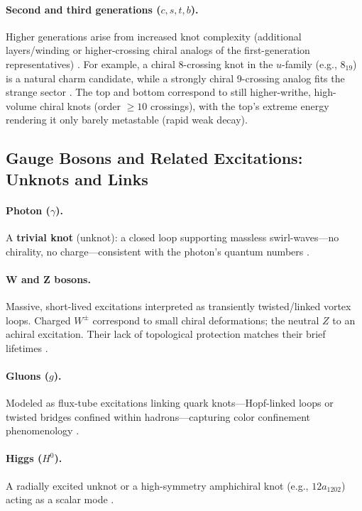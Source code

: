 \documentclass[11pt]{article}
\begin{document}
    \paragraph{Second and third generations ($c,s,t,b$).}
        Higher generations arise from increased knot complexity (additional layers/winding or higher-crossing chiral analogs of the first-generation representatives) \cite{Iskandarani2025Mass}. For example, a chiral 8-crossing knot in the $u$-family (e.g., $8_{19}$) is a natural charm candidate, while a strongly chiral 9-crossing analog fits the strange sector \cite{KnotAtlas}. The top and bottom correspond to still higher-writhe, high-volume chiral knots (order $\geq 10$ crossings), with the top’s extreme energy rendering it only barely metastable (rapid weak decay).

\subsection{Gauge Bosons and Related Excitations: Unknots and Links}

\paragraph{Photon ($\gamma$).}
    A \textbf{trivial knot} (unknot): a closed loop supporting massless swirl-waves—no chirality, no charge—consistent with the photon’s quantum numbers \cite{Iskandarani2025Canon}.

\paragraph{W and Z bosons.}
    Massive, short-lived excitations interpreted as transiently twisted/linked vortex loops. Charged $W^\pm$ correspond to small chiral deformations; the neutral $Z$ to an achiral excitation. Their lack of topological protection matches their brief lifetimes \cite{Iskandarani2025Lagrangian}.

\paragraph{Gluons ($g$).}
    Modeled as flux-tube excitations linking quark knots—Hopf-linked loops or twisted bridges confined within hadrons—capturing color confinement phenomenology \cite{Iskandarani2025Lagrangian}.

\paragraph{Higgs ($H^0$).}
    A radially excited unknot or a high-symmetry amphichiral knot (e.g., $12a_{1202}$) acting as a scalar mode \cite{KnotAtlas}.
\end{document}
